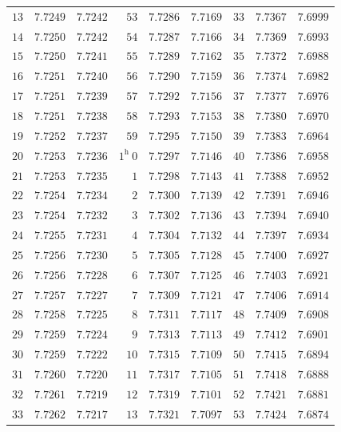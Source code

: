 \begin{center}
{{\begin{minipage}{.83\linewidth}
\begin{tabular}{r|r|r||r|r|r||r|r|r}
$13$ & $7.7249$ & $7.7242$ & $53$ & $7.7286$ & $7.7169$ & $33$ & $7.7367$ & $7.6999$\\
$14$ & $7.7250$ & $7.7242$ & $54$ & $7.7287$ & $7.7166$ & $34$ & $7.7369$ & $7.6993$\\
$15$ & $7.7250$ & $7.7241$ & $55$ & $7.7289$ & $7.7162$ & $35$ & $7.7372$ & $7.6988$\\[1.15pt]
$16$ & $7.7251$ & $7.7240$ & $56$ & $7.7290$ & $7.7159$ & $36$ & $7.7374$ & $7.6982$\\
$17$ & $7.7251$ & $7.7239$ & $57$ & $7.7292$ & $7.7156$ & $37$ & $7.7377$ & $7.6976$\\
$18$ & $7.7251$ & $7.7238$ & $58$ & $7.7293$ & $7.7153$ & $38$ & $7.7380$ & $7.6970$\\
$19$ & $7.7252$ & $7.7237$ & $59$ & $7.7295$ & $7.7150$ & $39$ & $7.7383$ & $7.6964$\\
$20$ & $7.7253$ & $7.7236$ & $1^{\mathrm h}\ 0$ & $7.7297$ & $7.7146$ & $40$ & $7.7386$ & $7.6958$\\[1.15pt]
$21$ & $7.7253$ & $7.7235$ & $1$ & $7.7298$ & $7.7143$ & $41$ & $7.7388$ & $7.6952$\\
$22$ & $7.7254$ & $7.7234$ & $2$ & $7.7300$ & $7.7139$ & $42$ & $7.7391$ & $7.6946$\\
$23$ & $7.7254$ & $7.7232$ & $3$ & $7.7302$ & $7.7136$ & $43$ & $7.7394$ & $7.6940$\\
$24$ & $7.7255$ & $7.7231$ & $4$ & $7.7304$ & $7.7132$ & $44$ & $7.7397$ & $7.6934$\\
$25$ & $7.7256$ & $7.7230$ & $5$ & $7.7305$ & $7.7128$ & $45$ & $7.7400$ & $7.6927$\\[1.15pt]
$26$ & $7.7256$ & $7.7228$ & $6$ & $7.7307$ & $7.7125$ & $46$ & $7.7403$ & $7.6921$\\
$27$ & $7.7257$ & $7.7227$ & $7$ & $7.7309$ & $7.7121$ & $47$ & $7.7406$ & $7.6914$\\
$28$ & $7.7258$ & $7.7225$ & $8$ & $7.7311$ & $7.7117$ & $48$ & $7.7409$ & $7.6908$\\
$29$ & $7.7259$ & $7.7224$ & $9$ & $7.7313$ & $7.7113$ & $49$ & $7.7412$ & $7.6901$\\
$30$ & $7.7259$ & $7.7222$ & $10$ & $7.7315$ & $7.7109$ & $50$ & $7.7415$ & $7.6894$\\[1.15pt]
$31$ & $7.7260$ & $7.7220$ & $11$ & $7.7317$ & $7.7105$ & $51$ & $7.7418$ & $7.6888$\\
$32$ & $7.7261$ & $7.7219$ & $12$ & $7.7319$ & $7.7101$ & $52$ & $7.7421$ & $7.6881$\\
$33$ & $7.7262$ & $7.7217$ & $13$ & $7.7321$ & $7.7097$ & $53$ & $7.7424$ & $7.6874$\\

\end{tabular}
\end{minipage}}}
\end{center}
